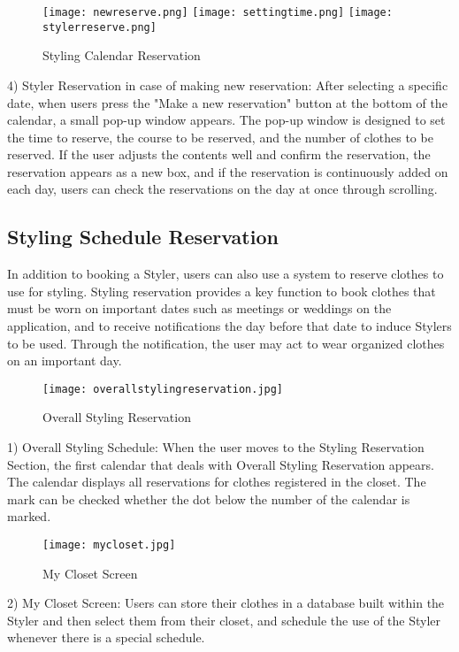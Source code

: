 \documentclass[conference]{IEEEtran}
\begin{document}
\begin{figure}[htbp]
\centerline{
\texttt{[image: newreserve.png]}
\texttt{[image: settingtime.png]}
\texttt{[image: stylerreserve.png]}
}
\caption{Styling Calendar Reservation}
\label{fig}
\end{figure}
4) Styler Reservation in case of making new reservation: After selecting a specific date, when users press the "Make a new reservation" button at the bottom of the calendar, a small pop-up window appears. The pop-up window is designed to set the time to reserve, the course to be reserved, and the number of clothes to be reserved. If the user adjusts the contents well and confirm the reservation, the reservation appears as a new box, and if the reservation is continuously added on each day, users can check the reservations on the day at once through scrolling.\\

\subsection{Styling Schedule Reservation}
In addition to booking a Styler, users can also use a system to reserve clothes to use for styling. Styling reservation provides a key function to book clothes that must be worn on important dates such as meetings or weddings on the application, and to receive notifications the day before that date to induce Stylers to be used. Through the notification, the user may act to wear organized clothes on an important day.\\

\begin{figure}[htbp]
\centerline{\texttt{[image: overallstylingreservation.jpg]}}
\label{fig}
\caption{Overall Styling Reservation}
\end{figure}
1) Overall Styling Schedule: When the user moves to the Styling Reservation Section, the first calendar that deals with Overall Styling Reservation appears. The calendar displays all reservations for clothes registered in the closet. The mark can be checked whether the dot below the number of the calendar is marked.

\begin{figure}[htbp]
\centerline{\texttt{[image: mycloset.jpg]}}
\label{fig}
\caption{My Closet Screen}
\end{figure}
2) My Closet Screen: Users can store their clothes in a database built within the Styler and then select them from their closet, and schedule the use of the Styler whenever there is a special schedule.\\
\end{document}
